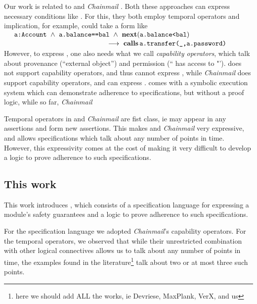 {Our work is related} to  {} \cite{VerX} and  \emph{Chainmail} \cite{FASE}.
Both these approaches can express necessary conditions
  like \SrobustA. For this, they  {both employ
  temporal operators and implication, for example,  \SrobustA
 could take a form like} 
\\
 $\strut ~  ~ \hspace{.1in} \strut  \prg{a:Account} \ \wedge\ \prg{a.balance==bal}  \ \wedge\ \textbf{next}(\prg{a.balance<bal}) $\\
 $\strut ~ \hspace{2in} \strut \strut \strut \longrightarrow\    \textbf{calls}\, {\texttt{a.transfer(\_,a.password)}}$
 \\
 { However, to express \SrobustB, one also needs what we call \emph{capability operators}, which talk about 
 provenance (``external object'') and
  permission (`` has access to "'). 
   {}  does not support capability operators, and thus cannot express   \SrobustB, 
   while  \emph{Chainmail} does support capability operators, and can express  \SrobustB. 
}  
 {} comes with a symbolic 
  execution system which can demonstrate adherence to  specifications, but without a proof logic, %
   while so far, \emph{Chainmail}  
  
 {Temporal operators in {}   and  \emph{Chainmail}  are fist class, ie may appear in any assertions 
and form new assertions. This makes{}   and  \emph{Chainmail} very expressive,
and allows specifications which talk about any number of points in time.
However, this expressivity comes at the cost of making it very difficult to develop a logic to
prove adherence to such specifications.}
  
\vspace{.04in}

\subsection{This work}
This work introduces \Nec, which consists of a specification language for expressing a module's safety guarantees 
and a logic 
to prove adherence to such specifications.

For the specification language we adopted %
\emph{Chainmail}'s %
  capability operators. For the 
  temporal operators, we observed that while their
   unrestricted combination   with  other logical connectives allows us to talk about any
   number of points in time, the examples found in the literature\footnote{here we should add ALL the works, ie
   Devriese, MaxPlank, VerX, and us} talk about two or at most three such points.
  
